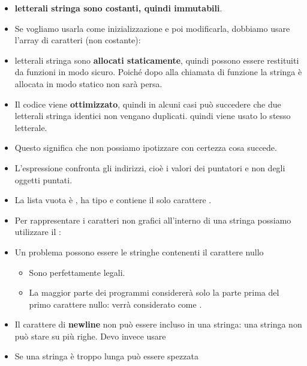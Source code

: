 \begin{itemize}
    \item \textbf{letterali stringa sono costanti, quindi immutabili}.
    \item  Se vogliamo usarla come inizializzazione e poi modificarla,
    dobbiamo usare l’array di caratteri (non costante):
    
    \item letterali stringa sono \textbf{allocati staticamente}, quindi possono essere restituiti da funzioni in modo sicuro. Poiché dopo alla chiamata di funzione la stringa è allocata in modo statico non sarà persa.
    
    
    \item Il codice viene \textbf{ottimizzato}, quindi in alcuni casi può
    succedere che due letterali stringa identici non vengano
    duplicati. quindi viene usato lo stesso letterale.
    \item Questo significa che non possiamo ipotizzare con certezza
    cosa succede.
    
    \item L’espressione \textcolor{blue}{} confronta gli indirizzi, cioè i valori
    dei puntatori e non degli oggetti puntati.
    \item La lista vuota è , ha tipo  e contiene il
    solo carattere .
    \item Per rappresentare i caratteri non grafici all’interno di una
    stringa possiamo utilizzare il \code{\textbackslash}:\newline
    \newline
    \item Un problema possono essere le stringhe contenenti il
    carattere nullo
    \begin{itemize}
        \item  Sono perfettamente legali.
        \item La maggior parte dei programmi considererà solo la parte
        prima del primo carattere nullo:  verrà considerato come .
        
    \end{itemize}
    \item  Il carattere di \textbf{newline} non può essere incluso in una
    stringa: una stringa non può stare su più righe. Devo
    invece usare 
    \item Se una stringa è troppo lunga può essere spezzata
    
\end{itemize}
\newpage
